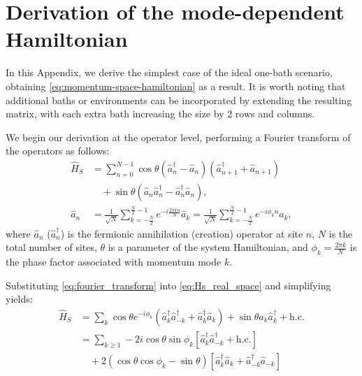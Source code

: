 \section{Derivation of the mode-dependent Hamiltonian}\label{app:Hk_derivation}

In this Appendix, we derive the simplest case of the ideal one-bath scenario, obtaining \cref{eq:momentum-space-hamiltonian} as a result. It is worth noting that additional baths or environments can be incorporated by extending the resulting matrix, with each extra bath increasing the size by 2 rows and columns.

We begin our derivation at the operator level, performing a Fourier transform of the operators as follows:
\begin{align}
    \hat{H}_S &= \sum_{n=0}^{N-1} \cos\theta(\hat{a}_n^{\dag}-\hat{a}_n)(\hat{a}_{n+1}^{\dag}+\hat{a}_{n+1}) \nonumber\\
              &\quad + \sin\theta(\hat{a}_n\hat{a}_n^\dag-\hat{a}_n^\dag \hat{a}_n), \label{eq:Hs_real_space}\\
    \hat{a}_n &= \frac{1}{\sqrt{N}}\sum_{k=-\frac{N}{2}}^{\frac{N}{2}-1}e^{-i\frac{2\pi k n}{N}}\hat{a}_k = \frac{1}{\sqrt{N}}\sum_{k=-\frac{N}{2}}^{\frac{N}{2}-1}e^{-i\phi_k n}\hat{a}_k, \label{eq:fourier_transform}
\end{align}
where $\hat{a}_n$ ($\hat{a}_n^\dag$) is the fermionic annihilation (creation) operator at site $n$, $N$ is the total number of sites, $\theta$ is a parameter of the system Hamiltonian, and $\phi_k = \frac{2\pi k}{N}$ is the phase factor associated with momentum mode $k$.

Substituting \cref{eq:fourier_transform} into \cref{eq:Hs_real_space} and simplifying yields:
\begin{align}
    \hat{H}_S &= \sum_k \cos\theta e^{-i\phi_k}(\hat{a}_k^\dag \hat{a}_{-k}^\dag+\hat{a}_k^\dag \hat{a}_{k})+\sin\theta\hat{a}_k\hat{a}_k^\dag + \text{h.c.} \nonumber\\
              &= \sum_{k\geq 1}-2i\cos\theta\sin\phi_k[\hat{a}_k^\dag \hat{a}_{-k}^\dag+\text{h.c.}] \nonumber\\
              &\quad +2(\cos\theta\cos\phi_k-\sin\theta)[\hat{a}_k^\dag \hat{a}_k+\hat{a}_{-k}^\dag \hat{a}_{-k}] \label{eq:Hs_momentum_space}
\end{align}